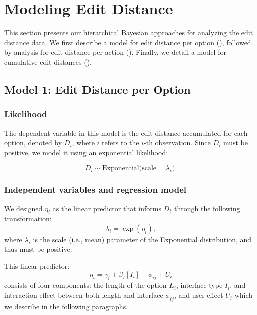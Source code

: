 \section{Modeling Edit Distance}\label{sec:apdx:model_distance}
This section presents our hierarchical Bayesian approaches for analyzing the edit distance data. We first describe a model for edit distance per option (), followed by analysis for edit distance per action (). Finally, we detail a model for cumulative edit distances ().

\subsection{Model 1: Edit Distance per Option} \label{sec:apdx:model_distance_option}

\subsubsection{Likelihood}
The dependent variable in this model is the edit distance accumulated for each option, denoted by $D_i$, where $i$ refers to the $i$-th observation. Since $D_i$ must be positive, we model it using an exponential likelihood:

\begin{equation}\label{eq:distance_model_1_likelihood}
D_i \sim \text{Exponential}\bigl(\text{scale} = \lambda_i\bigr).
\end{equation}

\subsubsection{Independent variables and regression model}
We designed $\eta_i$ as the linear predictor that informs $D_i$ through the following transformation:
\begin{equation}\label{eq:transformation_model_1}
\lambda_i = \exp(\eta_i),
\end{equation}
where $\lambda_i$ is the scale (i.e., mean) parameter of the Exponential distribution, and thus must be positive.

This linear predictor:
\begin{equation}\label{eq:distance_model_1_eta}
    \eta_i = \gamma_i + \beta_I[I_i] + \phi_{ij} + U_i
\end{equation}
consists of four components: the length of the option $L_i$, interface type $I_i$, and interaction effect between both length and interface $\phi_{ij}$, and user effect $U_i$ which we describe in the following paragraphs.

